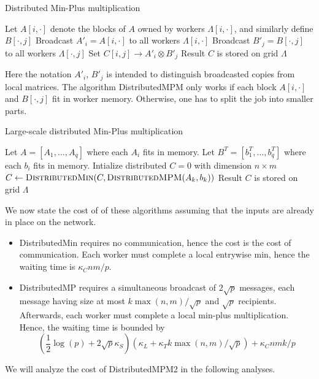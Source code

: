 \documentclass{article} %
\begin{document}
\begin{algorithm}[H]
\caption{Distributed Min-Plus multiplication}
\begin{algorithmic}
  \State Let $A[i, \cdot]$ denote the blocks of $A$ owned by workers $\Lambda[i, \cdot]$, and similarly define $B[\cdot, j]$
    \State Broadcast $A'_i = A[i, \cdot]$ to all workers $\Lambda[i, \cdot]$
    \State Broadcast $B'_j = B[\cdot, j]$ to all workers $\Lambda[\cdot, j]$
  \EndFor
    \State Set $C[i, j] \to A'_i \otimes B'_j$
  \EndFor
  \State Result $C$ is stored on grid $\Lambda$
\EndFunction
\end{algorithmic}
\end{algorithm}

Here the notation $A'_i$, $B'_j$ is intended to distinguish broadcasted copies from local matrices.
The algorithm {\sc DistributedMPM} only works if each block $A[i, \cdot]$ and $B[\cdot, j]$ fit in worker memory.
Otherwise, one has to split the job into smaller parts.

\begin{algorithm}[H]
\caption{Large-scale distributed Min-Plus multiplication}
\begin{algorithmic}
  \State Let $A = [A_1,\hdots, A_q]$ where each $A_i$ fits in memory.
  \State Let $B^T = [b_1^T, \hdots, b_q^T]$ where each $b_i$ fits in memory.
  \State Intialize distributed $C = 0$ with dimension $n \times m$
    \State $C \leftarrow \text{\sc DistributedMin}(C, \text{\sc DistributedMPM}(A_k, b_k))$
  \EndFor
  \State Result $C$ is stored on grid $\Lambda$
\EndFunction
\end{algorithmic}
\end{algorithm}

We now state the cost of of these algorithms assuming that the inputs
are already in place on the network.
\begin{itemize}
\item {\sc DistributedMin} requires no communication, hence the cost
  is the cost of communication.  Each worker must complete a local
  entrywise min, hence the waiting time is $\kappa_C nm/p$.
\item {\sc DistributedMP} requires a simultaneous broadcast of
  $2\sqrt{p}$ messages, each message having size at most $k\max(n,m)/\sqrt{p}$ and $\sqrt{p}$ recipients.
  Afterwards, each worker must complete a local min-plus multiplication.
  Hence, the waiting time is bounded by
\[
(\frac{1}{2}\log(p) + 2\sqrt{p}\kappa_S) (\kappa_L + \kappa_T k \max(n, m)/\sqrt{p}) + \kappa_C nmk/p
\] 
\end{itemize}
We will analyze the cost of {\sc DistributedMPM2} in the following analyses.
\end{document}
